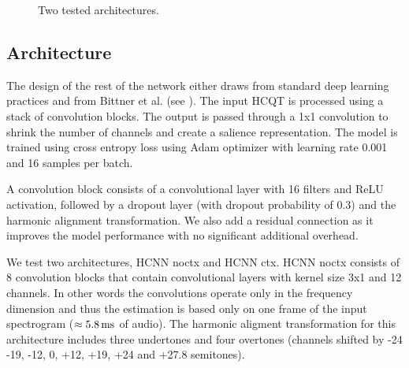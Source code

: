 \documentclass{article}
\begin{document}
\begin{figure}
 \centerline{}
 \caption{Two tested architectures.}
 \label{fig:hcnn_archs}
\end{figure}

\subsection{Architecture}

The design of the rest of the network either draws from standard deep learning practices and from Bittner et al. \cite{Bittner2017} (see ). The input HCQT is processed using a stack of convolution blocks. The output is passed through a 1x1 convolution to shrink the number of channels and create a salience representation. The model is trained using cross entropy loss using Adam optimizer with learning rate 0.001 and 16 samples per batch.

A convolution block consists of a convolutional layer with 16 filters and ReLU activation, followed by a dropout layer (with dropout probability of 0.3) and the harmonic alignment transformation. We also add a residual connection \cite{He2015} as it improves the model performance with no significant additional overhead.

We test two architectures, HCNN noctx and HCNN ctx. HCNN noctx consists of 8 convolution blocks that contain convolutional layers with kernel size 3x1 and 12 channels. In other words the convolutions operate only in the frequency dimension and thus the estimation is based only on one frame of the input spectrogram ($\approx 5.8\,\rm ms$ of audio). The harmonic aligment transformation for this architecture includes three undertones and four overtones (channels shifted by -24 -19, -12, 0, +12, +19, +24 and +27.8 semitones).
\end{document}

